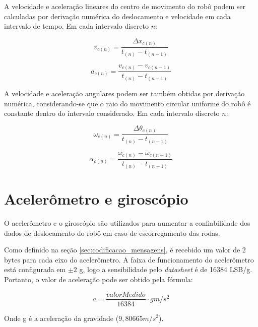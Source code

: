 A velocidade e aceleração lineares do centro de movimento do robô podem ser calculadas por derivação numérica do deslocamento e velocidade em cada intervalo de tempo. Em cada intervalo discreto $n$:

\begin{equation}
  v_{c (n)} = \frac{\Delta x_{c (n)} }{t_{(n)} - t_{(n-1)}}
  \label{eq:velocidade}
\end{equation}

\begin{equation}
  a_{c (n)} = \frac{v_{c (n)} - v_{c (n-1)}}{t_{(n)} - t_{(n-1)}}
  \label{eq:velocidade}
\end{equation}


A velocidade e aceleração angulares podem ser também obtidas por derivação numérica, considerando-se que o raio do movimento circular uniforme do robô é constante dentro do intervalo considerado. Em cada intervalo discreto $n$:

\begin{equation}
  \omega_{c (n)} = \frac{\Delta \theta_{c (n)} }{t_{(n)} - t_{(n-1)}}
  \label{eq:velocidade}
\end{equation}

\begin{equation}
  \alpha_{c (n)} = \frac{\omega_{c (n)} - \omega_{c (n-1)}}{t_{(n)} - t_{(n-1)}}
  \label{eq:velocidade}
\end{equation}


\section{Acelerômetro e giroscópio}
\label{sec:teoria_acel_giro}

O acelerômetro e o giroscópio são utilizados para aumentar a confiabilidade dos dados de deslocamento do robô em caso de escorregamento das rodas.



Como definido na seção \ref{sec:codificacao_mensagens}, é recebido um valor de 2 bytes para cada eixo do acelerômetro. A faixa de funcionamento do acelerômetro está configurada em $\pm 2$ g, logo a sensibilidade pelo \textit{datasheet} é de 16384 LSB/g. Portanto, o valor de aceleração pode ser obtido pela fórmula:

\begin{equation}
  a = \frac{valorMedido}{16384} \cdot g \unit{m/s^2}
  \label{eq:acel}
\end{equation}

Onde g é a aceleração da gravidade ($9,80665 \unit{m/s^2}$). 

